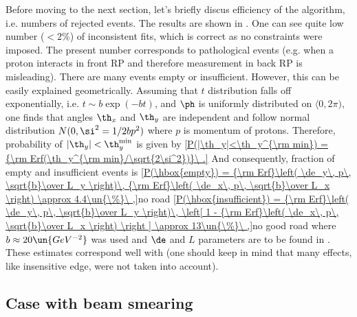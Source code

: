 Before moving to the next section, let's briefly discus efficiency of the algorithm, i.e. numbers of rejected events. The results are shown in . One can see quite low number ($< 2\%$) of inconsistent fits, which is correct as no constraints were imposed. The present number corresponds to pathological events (e.g. when a proton interacts in front RP and therefore measurement in back RP is misleading). There are many events empty or insufficient. However, this can be easily explained geometrically. Assuming that $t$ distribution falls off exponentially, i.e. $t\sim b\exp(-bt)$, and $\ph$ is uniformly distributed on $\langle 0, 2\pi)$, one finds that angles $\th_x$ and $\th_y$ are independent and follow normal distribution $N(0, \si^2 = 1/2bp^2)$ where $p$ is momentum of protons. Therefore, probability of $|\th_y|<\th_y^{\rm min}$ is given by
\eqref{P(|\th_y|<\th_y^{\rm min}) = {\rm Erf(\th_y^{\rm min}/\sqrt{2\si^2})}\ .}{}
And consequently, fraction of empty and insufficient events is
\eqref{P(\hbox{empty}) = {\rm Erf}\left( \de_y\, p\, \sqrt{b}\over L_y \right)\, {\rm Erf}\left( \de_x\, p\, \sqrt{b}\over L_x \right) \approx 4.4\un{\%}\ ,}{no road}
\eqref{P(\hbox{insufficient}) = {\rm Erf}\left( \de_y\, p\, \sqrt{b}\over L_y \right)\, \left[ 1 - {\rm Erf}\left( \de_x\, p\, \sqrt{b}\over L_x \right) \right ] \approx 13\un{\%}\ ,}{no good road}
where $b \approx 20\un{GeV^{-2}}$ was used and $\de$ and $L$ parameters are to be found in . These estimates correspond well with  (one should keep in mind that many effects, like insensitive edge, were not taken into account).



\subsection{Case with beam smearing}

